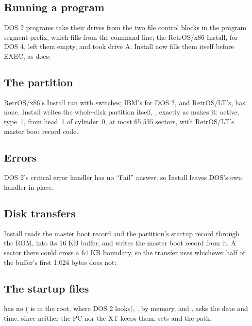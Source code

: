 \subsection{Running a program} DOS 2 programs take their drives from the
two file control blocks in the program segment prefix, which
 fills from the command line; the RetrOS/x86 Install,
for DOS 4, left them empty, and  took drive A. Install now
fills them itself before EXEC, as  does:



\subsection{The partition} RetrOS/x86's Install ran  with
switches; IBM's  for DOS 2, and RetrOS/LT's, has none. Install
writes the whole-disk partition itself, , exactly as
 makes it: active, type~1, from head~1 of cylinder~0, at most
65,535 sectors, with RetrOS/LT's master boot record code.

\subsection{Errors} DOS 2's critical error handler has no ``Fail'' answer,
so Install leaves DOS's own handler in place.

\subsection{Disk transfers} Install reads the master boot record and the
partition's startup record through the ROM, into its 16 KB buffer, and
writes the master boot record from it. A sector there could cross a 64 KB
boundary, so the transfer uses whichever half of the buffer's first 1,024
bytes does not:


\subsection{The startup files}  has no 
( is in the root, where DOS 2 looks), ,
 by memory, and .  asks
the date and time, since neither the PC nor the XT keeps them, sets
 and the path.

